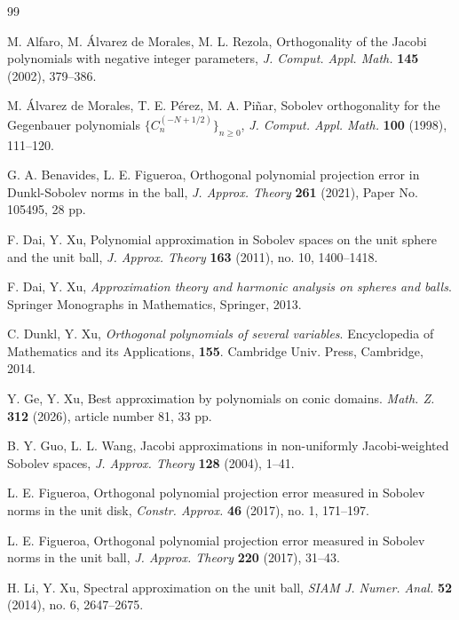 \documentclass{amsart}
\theoremstyle{remark}
\begin{document}
\begin{thebibliography}{99}

        M. Alfaro,  M. \'Alvarez de Morales, M. L. Rezola,
        Orthogonality of the Jacobi polynomials with negative integer parameters,
        \textit{J. Comput. Appl. Math.} \textbf{145} (2002), 379--386.

        M. \'Alvarez de Morales, T. E. P\'erez, M. A. Pi\~{n}ar,
        Sobolev orthogonality for the Gegenbauer polynomials $\{C_n^{(-N+1/2)}\}_{n\ge 0}$,
        \textit{J. Comput. Appl. Math.} \textbf{100} (1998), 111--120.

        G. A. Benavides, L. E. Figueroa,
        Orthogonal polynomial projection error in Dunkl-Sobolev norms in the ball,
        \textit{J. Approx. Theory} \textbf{261} (2021), Paper No. 105495, 28 pp.

        F. Dai, Y. Xu,
        Polynomial approximation in Sobolev spaces on the unit sphere and the unit ball,
        \textit{J. Approx. Theory} \textbf{163} (2011), no. 10, 1400--1418.

        F. Dai, Y. Xu,
        \textit{Approximation theory and harmonic analysis on spheres and balls}.
        Springer Monographs in Mathematics, Springer, 2013.

        C. Dunkl, Y. Xu,
        \textit{Orthogonal polynomials of several variables}.
        Encyclopedia of Mathematics and its Applications, \textbf{155}.
        Cambridge Univ. Press, Cambridge, 2014.

        Y. Ge, Y. Xu,
        Best approximation by polynomials on conic domains.
        \textit{Math. Z.} \textbf{312} (2026), article number 81, 33 pp. 

         B. Y. Guo, L. L. Wang,
         Jacobi approximations in non-uniformly Jacobi-weighted Sobolev spaces,
         \textit{J. Approx. Theory} \textbf{128} (2004), 1--41.

         L. E. Figueroa,
         Orthogonal polynomial projection error measured in Sobolev norms in the unit disk,
         \textit{Constr. Approx.} \textbf{46} (2017), no. 1, 171--197.

         L. E. Figueroa,
         Orthogonal polynomial projection error measured in Sobolev norms in the unit ball,
         \textit{J. Approx. Theory} \textbf{220} (2017), 31--43.

        H. Li, Y. Xu,
        Spectral approximation on the unit ball,
        \textit{SIAM J. Numer. Anal.} \textbf{52} (2014), no. 6, 2647--2675.


\end{thebibliography}
\end{document}
